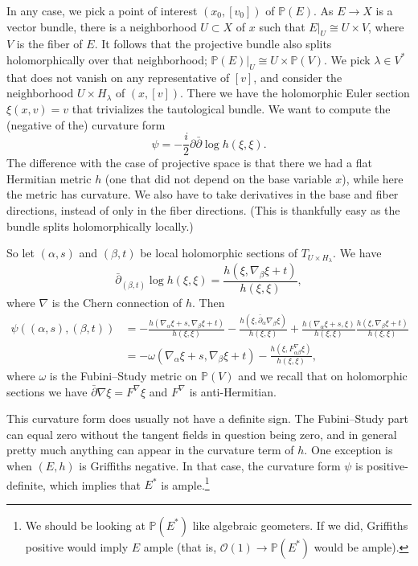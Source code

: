 \documentclass[11pt]{article}
\theoremstyle{definition}
\newcommand{\kk}[1]{\mathbb{#1}}
\newcommand{\cc}[1]{\mathcal{#1}}
\begin{document}
In any case, we pick a point of interest $(x_0, [v_0])$ of $\kk P(E)$. As $E \to X$ is a vector bundle, there is a neighborhood $U \subset X$ of $x$ such that $E|_U \cong U \times V$, where $V$ is the fiber of $E$. It follows that the projective bundle also splits holomorphically over that neighborhood; $\kk P(E)|_U \cong U \times \kk P(V)$. We pick $\lambda \in V^*$ that does not vanish on any representative of $[v]$, and consider the neighborhood $U \times H_\lambda$ of $(x, [v])$. There we have the holomorphic Euler section $\xi(x, v) = v$ that trivializes the tautological bundle. We want to compute the (negative of the) curvature form
$$
\psi = -\frac i2 \partial \bar\partial \log h(\xi, \xi).
$$
The difference with the case of projective space is that there we had a flat Hermitian metric $h$ (one that did not depend on the base variable $x$), while here the metric has curvature. We also have to take derivatives in the base and fiber directions, instead of only in the fiber directions. (This is thankfully easy as the bundle splits holomorphically locally.)

So let $(\alpha, s)$ and $(\beta, t)$ be local holomorphic sections of $T_{U \times H_\lambda}$. We have
$$
\bar\partial_{(\beta, t)} \log h(\xi,\xi)
= \frac{h(\xi, \nabla_\beta \xi + t)}{h(\xi,\xi)},
$$
where $\nabla$ is the Chern connection of $h$. Then
\begin{align*}
\psi((\alpha,s), (\beta,t))
&= -\frac{h(\nabla_\alpha \xi + s, \nabla_\beta \xi + t)}{h(\xi,\xi)}
- \frac{h(\xi, \bar\partial_\alpha \nabla_\beta \xi)}{h(\xi,\xi)}
+ \frac{h(\nabla_\alpha \xi + s, \xi)}{h(\xi,\xi)}
\frac{h(\xi, \nabla_\beta \xi + t)}{h(\xi,\xi)}
\\
&= -\omega(\nabla_\alpha \xi + s, \nabla_\beta \xi + t)
- \frac{h(\xi, F^\nabla_{\alpha\beta}\xi)}{h(\xi,\xi)},
\end{align*}
where $\omega$ is the Fubini--Study metric on $\kk P(V)$ and we recall that on holomorphic sections we have $\bar\partial \nabla \xi = F^\nabla \xi$ and $F^\nabla$ is anti-Hermitian.

This curvature form does usually not have a definite sign. The Fubini--Study part can equal zero without the tangent fields in question being zero, and in general pretty much anything can appear in the curvature term of $h$. One exception is when $(E,h)$ is Griffiths negative. In that case, the curvature form $\psi$ is positive-definite, which implies that $E^*$ is ample.\footnote{We should be looking at $\kk P(E^*)$ like algebraic geometers. If we did, Griffiths positive would imply $E$ ample (that is, $\cc O(1) \to \kk P(E^*)$ would be ample).}
\end{document}

